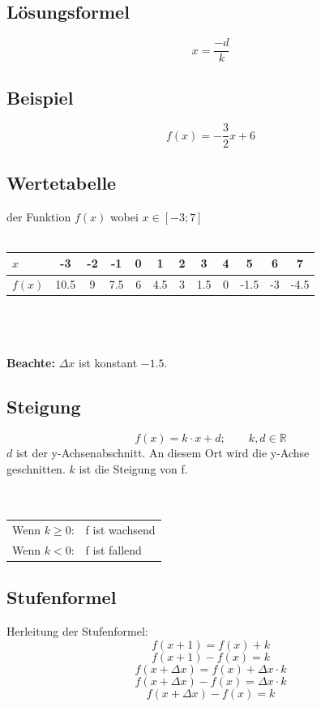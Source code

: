 \documentclass[12pt,a4paper]{scrbook}
\begin{document}
\subsection{Lösungsformel}
\[x = \frac{-d}{k}\]

\subsection{Beispiel}
\[f(x) = -\frac{3}{2}x + 6\]

\subsection{Wertetabelle} der Funktion $f(x)$ wobei $x \in [-3; 7]$\\\\
\begin{tabular}{l||c|c|c|c|c|c|c|c|c|c|c}
$x$ & -3 & -2 & -1 & 0 & 1 & 2 & 3 & 4 & 5 & 6 & 7\\
\hline
$f(x)$ & 10.5 & 9 & 7.5 & 6 & 4.5 & 3 & 1.5 & 0 & -1.5 & -3 & -4.5\\
\end{tabular}\\\\\\
\textbf{Beachte:} $\Delta x$ ist konstant $-1.5$.\\

\subsection{Steigung}
\[f(x) = k\cdot x + d; \quad\quad k,d \in \mathbb{R}\]
$d$ ist der y-Achsenabschnitt. An diesem Ort wird die y-Achse\\
geschnitten. $k$ ist die Steigung von f.\\\\\\
\begin{tabular}{ll}
Wenn $k \geq 0$: & f ist wachsend\\
Wenn $k < 0$: & f ist fallend\\
\end{tabular}

\subsection{Stufenformel}
Herleitung der Stufenformel:
\[f(x+1) = f(x) + k\]
\[f(x+1) - f(x) = k\]
\[f(x+\Delta x) = f(x) + \Delta x \cdot k\]
\[f(x+\Delta x) - f(x) = \Delta x \cdot k\]
\[f(x+\Delta x) - f(x) = k\]
\end{document}
